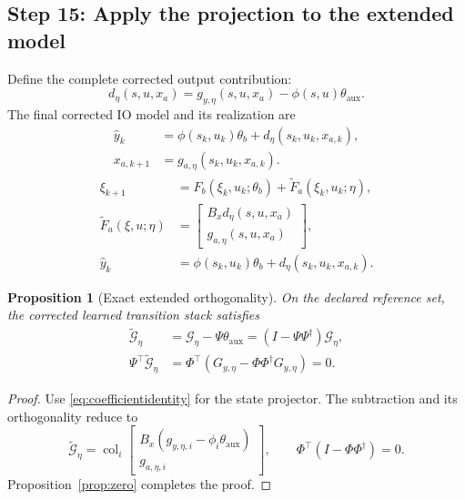 \documentclass[11pt,a4paper]{article}
\newcommand{\col}{\operatorname{col}}
\newtheorem{proposition}{Proposition}
\begin{document}
\subsection*{Step 15: Apply the projection to the extended model}
Define the complete corrected output contribution:
\begin{equation}\label{eq:extendedcorrection}
d_\eta(s,u,x_a)=g_{y,\eta}(s,u,x_a)-\phi(s,u)\theta_{\mathrm{aux}}.
\end{equation}
The final corrected IO model and its realization are
\begin{equation}\label{eq:finalIO}
\boxed{\begin{aligned}
\hat y_k&=\phi(s_k,u_k)\theta_b+d_\eta(s_k,u_k,x_{a,k}),\\
x_{a,k+1}&=g_{a,\eta}(s_k,u_k,x_{a,k}).
\end{aligned}}
\end{equation}
\begin{equation}\label{eq:finalSS}
\boxed{\begin{aligned}
\xi_{k+1}&=F_b(\xi_k,u_k;\theta_b)+\widetilde F_a(\xi_k,u_k;\eta),\\
\widetilde F_a(\xi,u;\eta)&=\begin{bmatrix}B_xd_\eta(s,u,x_a)\\g_{a,\eta}(s,u,x_a)\end{bmatrix},\\
\hat y_k&=\phi(s_k,u_k)\theta_b+d_\eta(s_k,u_k,x_{a,k}).
\end{aligned}}
\end{equation}
\begin{proposition}[Exact extended orthogonality]\label{prop:projection}
On the declared reference set, the corrected learned transition stack satisfies
\begin{equation}\label{eq:finalidentity}
\boxed{\begin{aligned}
\widetilde{\mathcal G}_\eta&=\mathcal G_\eta-\Psi \theta_{\mathrm{aux}}
=(I-\Psi\Psi^\dagger)\mathcal G_\eta,\\
\Psi^\top\widetilde{\mathcal G}_\eta
&=\Phi^\top(G_{y,\eta}-\Phi\Phi^\dagger G_{y,\eta})=0.
\end{aligned}}
\end{equation}
\end{proposition}
\begin{proof}
Use \eqref{eq:coefficientidentity} for the state projector. The subtraction and its orthogonality reduce to
\begin{equation}\label{eq:subtractionblocks}
\widetilde{\mathcal G}_\eta=\col_i\begin{bmatrix}B_x(g_{y,\eta,i}-\phi_i \theta_{\mathrm{aux}})\\g_{a,\eta,i}\end{bmatrix},
\qquad \Phi^\top(I-\Phi\Phi^\dagger)=0.
\end{equation}
Proposition~\ref{prop:zero} completes the proof.
\end{proof}
\end{document}
